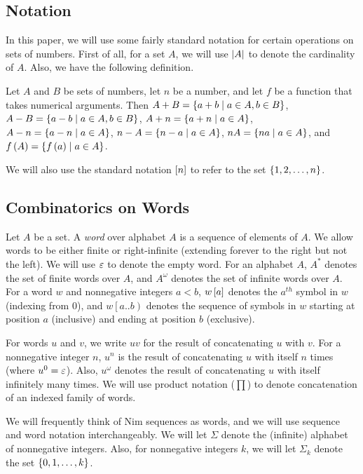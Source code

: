 \documentclass[english,12pt]{article}
\begin{document}
\subsection{Notation}\label{ss:notation}
In this paper, we will use some fairly standard notation for certain operations on sets of numbers.  First of all, for a set $A$, we will use $\left|A\right|$ to denote the cardinality of $A$. Also, we have the following definition.
\begin{defin}
Let $A$ and $B$ be sets of numbers, let $n$ be a number, and let $f$ be a function that takes numerical arguments.  Then $A+B=\left\{a+b\mid a\in A, b\in B\right\}$, $A-B=\left\{a-b\mid a\in A, b\in B\right\}$, $A+n=\left\{a+n\mid a\in A\right\}$, $A-n=\left\{a-n\mid a\in A\right\}$, $n-A=\left\{n-a\mid a\in A\right\}$, $nA=\left\{na\mid a\in A\right\}$, and $f\left(A\right)=\left\{f\left(a\right)\mid a\in A\right\}$.
\end{defin}
We will also use the standard notation $\left[n\right]$ to refer to the set $\left\{1,2,\ldots,n\right\}$.
\subsection{Combinatorics on Words}\label{ss:words}
Let $A$ be a set.  A \emph{word} over alphabet $A$ is a sequence of elements of $A$.  We allow words to be either finite or right-infinite (extending forever to the right but not the left).  We will use $\varepsilon$ to denote the empty word.  For an alphabet $A$, $A^*$ denotes the set of finite words over $A$, and $A^\omega$ denotes the set of infinite words over $A$.  For a word $w$ and nonnegative integers $a<b$, $w\left[a\right]$ denotes the $a^{th}$ symbol in $w$ (indexing from $0$), and $w\left[a..b\right)$ denotes the sequence of symbols in $w$ starting at position $a$ (inclusive) and ending at position $b$ (exclusive).

For words $u$ and $v$, we write $uv$ for the result of concatenating $u$ with $v$.  For a nonnegative integer $n$, $u^n$ is the result of concatenating $u$ with itself $n$ times (where $u^0=\varepsilon$).  Also, $u^\omega$ denotes the result of concatenating $u$ with itself infinitely many times.  We will use product notation ($\prod$) to denote concatenation of an indexed family of words.

We will frequently think of Nim sequences as words, and we will use sequence and word notation interchangeably.  We will let $\Sigma$ denote the (infinite) alphabet of nonnegative integers.  Also, for nonnegative integers $k$, we will let $\Sigma_k$ denote the set $\left\{0,1,\ldots,k\right\}$.
\end{document}
